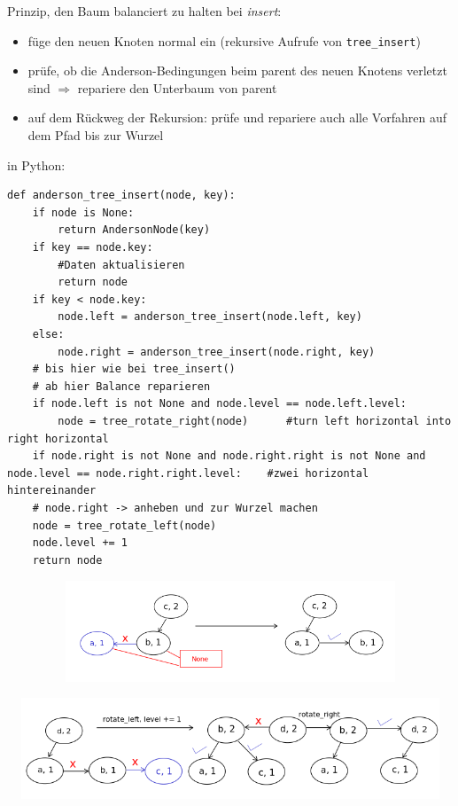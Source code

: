 Prinzip, den Baum balanciert zu halten bei \emph{insert}:
\begin{itemize}
    \item füge den neuen Knoten normal ein (rekursive Aufrufe von \verb|tree_insert|)
    \item prüfe, ob die Anderson-Bedingungen beim parent des neuen Knotens verletzt sind $\Rightarrow$ repariere den Unterbaum von parent
    \item auf dem Rückweg der Rekursion: prüfe und repariere auch alle Vorfahren auf dem Pfad bis zur Wurzel
\end{itemize}
in Python:
\begin{verbatim}
def anderson_tree_insert(node, key):
    if node is None:
        return AndersonNode(key)
    if key == node.key:
        #Daten aktualisieren
        return node
    if key < node.key:
        node.left = anderson_tree_insert(node.left, key)
    else:
        node.right = anderson_tree_insert(node.right, key)
    # bis hier wie bei tree_insert()
    # ab hier Balance reparieren
    if node.left is not None and node.level == node.left.level:
        node = tree_rotate_right(node)      #turn left horizontal into right horizontal
    if node.right is not None and node.right.right is not None and node.level == node.right.right.level:    #zwei horizontal hintereinander
    # node.right -> anheben und zur Wurzel machen
    node = tree_rotate_left(node)
    node.level += 1
    return node
\end{verbatim}
\includegraphics[width=16cm,height=3cm,keepaspectratio]{./Pictures/AndersonPython1.png}

\includegraphics[width=16cm,height=3cm,keepaspectratio]{./Pictures/AndersonPython2.png}

